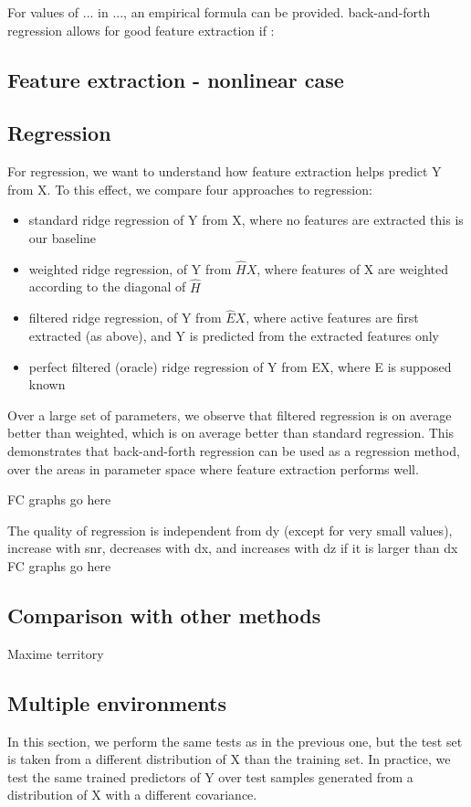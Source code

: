 \documentclass{article}
\begin{document}
For values of ...
%
in ..., an empirical formula can be provided.
%
back-and-forth regression allows for good feature extraction if :

\subsection{Feature extraction - nonlinear case}


\subsection{Regression }
For regression, we want to understand how feature extraction helps predict Y from X.
%
To this effect, we compare four approaches to regression:
\begin{itemize}
\item standard ridge regression of Y from X, where no features are extracted this is our baseline
\item weighted ridge regression, of Y from $\hat H X$, where features of X are weighted according to the diagonal of $\hat H$
\item filtered ridge regression, of Y from $\hat E X$, where active features are first extracted (as above), and Y is predicted from the extracted features only
\item perfect filtered (oracle) ridge regression of Y from EX, where E is supposed known
\end{itemize}
Over a large set of parameters, we observe that filtered regression is on average better than weighted, which is on average better than standard regression.
%
This demonstrates that back-and-forth regression can be used as a regression method, over the areas in parameter space where feature extraction performs well.

FC graphs go here

The quality of regression is independent from dy (except for very small values), increase with snr, decreases with dx, and increases with dz if it is larger than dx
FC graphs go here

\subsection{Comparison with other methods}
Maxime territory

\subsection{Multiple environments}
In this section, we perform the same tests as in the previous one, but the test set is taken from a different distribution of X than the training set.
%
In practice, we test the same trained predictors of Y over test samples generated from a distribution of X with a different covariance.
\end{document}

